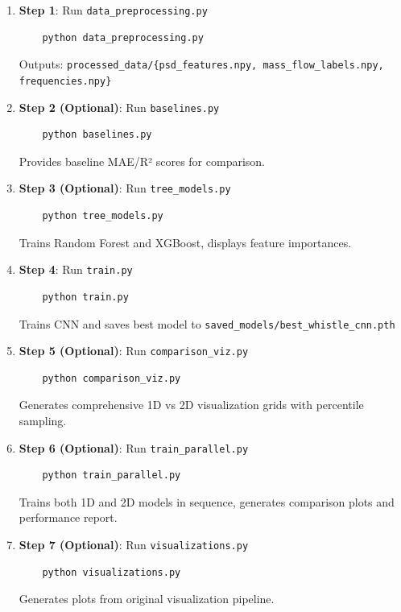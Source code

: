 \begin{enumerate}
    \item \textbf{Step 1}: Run \verb|data_preprocessing.py|
    \begin{verbatim}
    python data_preprocessing.py
    \end{verbatim}
    Outputs: \verb|processed_data/{psd_features.npy, mass_flow_labels.npy, frequencies.npy}|
    
    \item \textbf{Step 2 (Optional)}: Run \verb|baselines.py|
    \begin{verbatim}
    python baselines.py
    \end{verbatim}
    Provides baseline MAE/R² scores for comparison.
    
    \item \textbf{Step 3 (Optional)}: Run \verb|tree_models.py|
    \begin{verbatim}
    python tree_models.py
    \end{verbatim}
    Trains Random Forest and XGBoost, displays feature importances.
    
    \item \textbf{Step 4}: Run \verb|train.py|
    \begin{verbatim}
    python train.py
    \end{verbatim}
    Trains CNN and saves best model to \verb|saved_models/best_whistle_cnn.pth|
    
    \item \textbf{Step 5 (Optional)}: Run \verb|comparison_viz.py|
    \begin{verbatim}
    python comparison_viz.py
    \end{verbatim}
    Generates comprehensive 1D vs 2D visualization grids with percentile sampling.
    
    \item \textbf{Step 6 (Optional)}: Run \verb|train_parallel.py|
    \begin{verbatim}
    python train_parallel.py
    \end{verbatim}
    Trains both 1D and 2D models in sequence, generates comparison plots and performance report.
    
    \item \textbf{Step 7 (Optional)}: Run \verb|visualizations.py|
    \begin{verbatim}
    python visualizations.py
    \end{verbatim}
    Generates plots from original visualization pipeline.
\end{enumerate}

